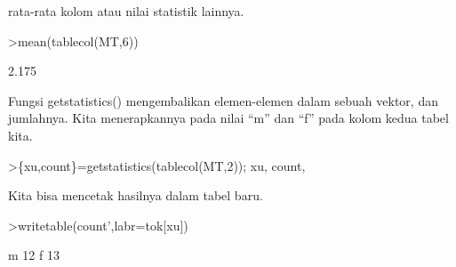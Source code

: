 \documentclass[a4paper,10pt]{article}
\begin{document}
\begin{eulernotebook}
\begin{eulercomment}
\begin{eulercomment}
\begin{eulercomment}
\begin{eulercomment}
\begin{eulercomment}
\begin{eulercomment}
\begin{eulercomment}
\begin{eulercomment}
\begin{eulercomment}
\begin{eulercomment}
\begin{eulercomment}
\begin{eulercomment}
\begin{eulercomment}
\begin{eulercomment}
\begin{eulercomment}
\begin{eulercomment}
\begin{eulercomment}
\begin{eulercomment}
\begin{eulercomment}
\begin{eulercomment}
\begin{eulercomment}
\begin{eulercomment}
\begin{eulercomment}
\begin{eulercomment}
\begin{eulercomment}
\begin{eulercomment}
\begin{eulercomment}
\begin{eulercomment}
\begin{eulercomment}
\begin{eulercomment}
\begin{eulercomment}
\begin{eulercomment}
\begin{eulercomment}
\begin{eulercomment}
\begin{eulercomment}
\begin{eulercomment}
\begin{eulercomment}
\begin{eulercomment}
\begin{eulercomment}
\begin{eulercomment}
\begin{eulercomment}
\begin{eulercomment}
\begin{eulercomment}
\begin{eulercomment}
\begin{eulercomment}
rata-rata kolom atau nilai statistik lainnya.
\end{eulercomment}
\begin{eulerprompt}
>mean(tablecol(MT,6))
\end{eulerprompt}
\begin{euleroutput}
  2.175
\end{euleroutput}
\begin{eulercomment}
Fungsi getstatistics() mengembalikan elemen-elemen dalam sebuah
vektor, dan jumlahnya. Kita menerapkannya pada nilai “m” dan “f” pada
kolom kedua tabel kita.
\end{eulercomment}
\begin{eulerprompt}
>\{xu,count\}=getstatistics(tablecol(MT,2)); xu, count,
\end{eulerprompt}
\begin{euleroutput}
  [1,  3]
  [12,  13]
\end{euleroutput}
\begin{eulercomment}
Kita bisa mencetak hasilnya dalam tabel baru.
\end{eulercomment}
\begin{eulerprompt}
>writetable(count',labr=tok[xu])
\end{eulerprompt}
\begin{euleroutput}
           m        12
           f        13
\end{euleroutput}
\begin{eulercomment}

\end{eulercomment}
\end{eulercomment}
\end{eulercomment}
\end{eulercomment}
\end{eulercomment}
\end{eulercomment}
\end{eulercomment}
\end{eulercomment}
\end{eulercomment}
\end{eulercomment}
\end{eulercomment}
\end{eulercomment}
\end{eulercomment}
\end{eulercomment}
\end{eulercomment}
\end{eulercomment}
\end{eulercomment}
\end{eulercomment}
\end{eulercomment}
\end{eulercomment}
\end{eulercomment}
\end{eulercomment}
\end{eulercomment}
\end{eulercomment}
\end{eulercomment}
\end{eulercomment}
\end{eulercomment}
\end{eulercomment}
\end{eulercomment}
\end{eulercomment}
\end{eulercomment}
\end{eulercomment}
\end{eulercomment}
\end{eulercomment}
\end{eulercomment}
\end{eulercomment}
\end{eulercomment}
\end{eulercomment}
\end{eulercomment}
\end{eulercomment}
\end{eulercomment}
\end{eulercomment}
\end{eulercomment}
\end{eulercomment}
\end{eulercomment}
\end{eulernotebook}
\end{document}
